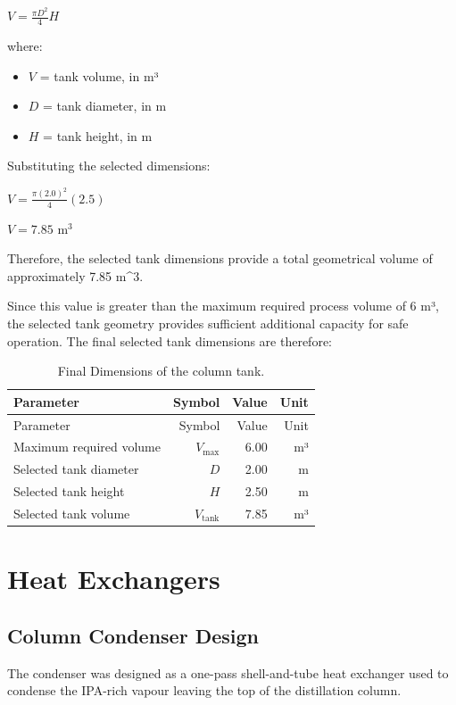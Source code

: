\(V = \frac{\pi D^2}{4}H\)

where:

\begin{itemize}
\tightlist
\item
  \(V\) = tank volume, in m³
\item
  \(D\) = tank diameter, in m
\item
  \(H\) = tank height, in m
\end{itemize}

Substituting the selected dimensions:

\(V = \frac{\pi (2.0)^2}{4}(2.5)\)

\(V = 7.85 \text{ m}^3\)

Therefore, the selected tank dimensions provide a total geometrical
volume of approximately 7.85 m\^{}3.

Since this value is greater than the maximum required process volume of
6 m³, the selected tank geometry provides sufficient additional capacity
for safe operation. The final selected tank dimensions are therefore:

\begin{longtable}[]{@{}lrrr@{}}
\caption{Final Dimensions of the column tank.
\label{tab:Final Dimensions of the column tank}}\tabularnewline
\toprule\noalign{}
Parameter & Symbol & Value & Unit \\
\midrule\noalign{}
\endfirsthead
\toprule\noalign{}
Parameter & Symbol & Value & Unit \\
\midrule\noalign{}
\endhead
\bottomrule\noalign{}
\endlastfoot
Maximum required volume & \(V_{\text{max}}\) & 6.00 & m³ \\
Selected tank diameter & \(D\) & 2.00 & m \\
Selected tank height & \(H\) & 2.50 & m \\
Selected tank volume & \(V_{\text{tank}}\) & 7.85 & m³ \\
\end{longtable}

\chapter{Heat Exchangers}\label{heat-exchangers-1}

\section{Column Condenser Design}\label{column-condenser-design}

The condenser was designed as a one-pass shell-and-tube heat exchanger
used to condense the IPA-rich vapour leaving the top of the distillation
column.

